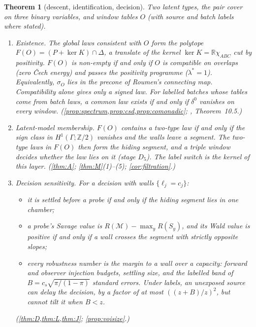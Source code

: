 \documentclass[11pt]{article}
\newtheorem{theorem}{Theorem}\renewcommand{\thetheorem}{\Alph{theorem}}
\theoremstyle{definition}\newtheorem{definition}{Definition}\newtheorem{remark}{Remark}
\begin{document}
\begin{theorem}[descent, identification, decision]\label{thm:N}
Two latent types, the pair cover on three binary variables, and window tables $O$ (with source and batch labels where stated).
\begin{enumerate}
\item[(i)] \emph{Existence.} The global laws consistent with $O$ form the polytope $F(O)=(P+\ker K)\cap\Delta$, a translate of the kernel
  $\ker K=\mathbb R\chi_{ABC}$ cut by positivity. $F(O)$ is non-empty if and only if $O$ is compatible on overlaps (zero Čech energy) and
  passes the positivity programme ($\lambda^*=1$). Equivalently, $\sigma_O$ lies in the precone of Roumen's connecting map.
  Compatibility alone gives only a signed law. For labelled batches whose tables come from batch laws, a common law exists if and only if
  $\delta^0$ vanishes on every window.
  (\cref{prop:spectrum,prop:csd,prop:comonadic}; \cite{Roumen2017}, Theorem~10.5.)
\item[(ii)] \emph{Latent-model membership.} $F(O)$ contains a two-type law if and only if the sign class in $H^1(\Gamma;\mathbb Z/2)$
  vanishes and the walls leave a segment. The two-type laws in $F(O)$ then form the hiding segment, and a triple window decides whether the
  law lies on it (stage $D_5$). The label switch is the kernel of this layer.
  (\cref{thm:A}; \cref{thm:M}(1)--(5); \cref{cor:filtration}.)
\item[(iii)] \emph{Decision sensitivity.} For a decision with walls $\{\ell_j=c_j\}$:
  \begin{itemize}
  \item it is settled before a probe if and only if the hiding segment lies in one chamber;
  \item a probe's Savage value is $R(\mathcal M)-\max_yR(S_y)$, and its Wald value is positive if and only if a wall crosses the segment
    with strictly opposite slopes;
  \item every robustness number is the margin to a wall over a capacity: forward and observer injection budgets, settling size, and the
    labelled band of $B=c_s\sqrt{\pi/(1-\pi)}$ standard errors. Under labels, an unexposed source can delay the decision, by a factor of
    at most $((z+B)/z)^2$, but cannot tilt it when $B<z$.
  \end{itemize}
  (\cref{thm:D,thm:L,thm:J}; \cref{prop:voisize}.)
\end{enumerate}
\end{theorem}
\end{document}
